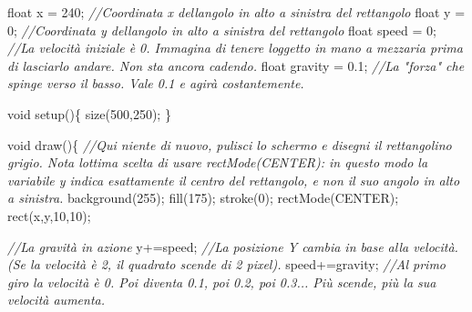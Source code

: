\documentclass[
]{article}
\newenvironment{Shaded}{}{}
\newcommand{\CommentTok}[1]{\textcolor[rgb]{0.38,0.63,0.69}{\textit{#1}}}
\newcommand{\DataTypeTok}[1]{\textcolor[rgb]{0.56,0.13,0.00}{#1}}
\newcommand{\DecValTok}[1]{\textcolor[rgb]{0.25,0.63,0.44}{#1}}
\newcommand{\FloatTok}[1]{\textcolor[rgb]{0.25,0.63,0.44}{#1}}
\newcommand{\FunctionTok}[1]{\textcolor[rgb]{0.02,0.16,0.49}{#1}}
\newcommand{\NormalTok}[1]{#1}
\newcommand{\OperatorTok}[1]{\textcolor[rgb]{0.40,0.40,0.40}{#1}}
\begin{document}
\begin{Shaded}
\begin{Highlighting}[]
\DataTypeTok{float}\NormalTok{ x }\OperatorTok{=} \DecValTok{240}\OperatorTok{;} \CommentTok{//Coordinata x dell\textquotesingle{}angolo in alto a sinistra del rettangolo}
\DataTypeTok{float}\NormalTok{ y }\OperatorTok{=} \DecValTok{0}\OperatorTok{;} \CommentTok{//Coordinata y dell\textquotesingle{}angolo in alto a sinistra del rettangolo}
\DataTypeTok{float}\NormalTok{ speed }\OperatorTok{=} \DecValTok{0}\OperatorTok{;} \CommentTok{//La velocità iniziale è 0. Immagina di tenere l\textquotesingle{}oggetto in mano a mezz\textquotesingle{}aria prima di lasciarlo andare. Non sta ancora cadendo.}
\DataTypeTok{float}\NormalTok{ gravity }\OperatorTok{=} \FloatTok{0.1}\OperatorTok{;} \CommentTok{//La "forza" che spinge verso il basso. Vale 0.1 e agirà costantemente.}

\DataTypeTok{void} \FunctionTok{setup}\OperatorTok{()\{}
    \FunctionTok{size}\OperatorTok{(}\DecValTok{500}\OperatorTok{,}\DecValTok{250}\OperatorTok{);}
\OperatorTok{\}}

\DataTypeTok{void} \FunctionTok{draw}\OperatorTok{()\{}  
\CommentTok{//Qui niente di nuovo, pulisci lo schermo e disegni il rettangolino grigio. Nota l\textquotesingle{}ottima scelta di usare rectMode(CENTER): in questo modo la variabile y indica esattamente il centro del rettangolo, e non il suo angolo in alto a sinistra.}
    \FunctionTok{background}\OperatorTok{(}\DecValTok{255}\OperatorTok{);}
    \FunctionTok{fill}\OperatorTok{(}\DecValTok{175}\OperatorTok{);}
    \FunctionTok{stroke}\OperatorTok{(}\DecValTok{0}\OperatorTok{);}
    \FunctionTok{rectMode}\OperatorTok{(}\NormalTok{CENTER}\OperatorTok{);} 
    \FunctionTok{rect}\OperatorTok{(}\NormalTok{x}\OperatorTok{,}\NormalTok{y}\OperatorTok{,}\DecValTok{10}\OperatorTok{,}\DecValTok{10}\OperatorTok{);}
    
    \CommentTok{//La gravità in azione}
\NormalTok{    y}\OperatorTok{+=}\NormalTok{speed}\OperatorTok{;} \CommentTok{//La posizione Y cambia in base alla velocità. (Se la velocità è 2, il quadrato scende di 2 pixel).}
\NormalTok{    speed}\OperatorTok{+=}\NormalTok{gravity}\OperatorTok{;} \CommentTok{//Al primo giro la velocità è 0. Poi diventa 0.1, poi 0.2, poi 0.3... Più scende, più la sua velocità aumenta.}
    

\end{Highlighting}
\end{Shaded}
\end{document}
